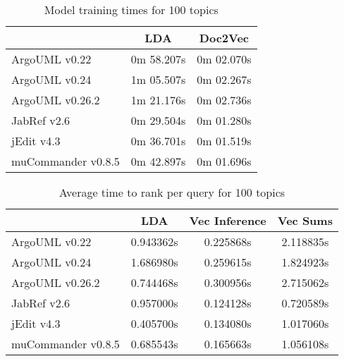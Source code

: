 \begin{table}
\centering
\begin{tabular}{lcc}
\toprule
                {} & LDA    & Doc2Vec \\
\midrule
ArgoUML v0.22      &  0m 58.207s     &  0m 02.070s     \\
ArgoUML v0.24      &  1m 05.507s     &  0m 02.267s     \\
ArgoUML v0.26.2    &  1m 21.176s     &  0m 02.736s     \\
JabRef v2.6        &  0m 29.504s     &  0m 01.280s     \\
jEdit v4.3         &  0m 36.701s     &  0m 01.519s     \\
muCommander v0.8.5 &  0m 42.897s     &  0m 01.696s     \\
\bottomrule
\end{tabular}
\caption{Model training times for 100 topics}
\end{table}


\begin{table}
\centering
\begin{tabular}{lccc}
\toprule
                {} & LDA    & Vec Inference & Vec Sums \\
\midrule
ArgoUML v0.22      & 0.943362s      &  0.225868s     &  2.118835s         \\
ArgoUML v0.24      & 1.686980s      &  0.259615s     &  1.824923s         \\
ArgoUML v0.26.2    & 0.744468s      &  0.300956s     &  2.715062s         \\
JabRef v2.6        & 0.957000s      &  0.124128s     &  0.720589s         \\
jEdit v4.3         & 0.405700s      &  0.134080s     &  1.017060s         \\
muCommander v0.8.5 & 0.685543s      &  0.165663s     &  1.056108s         \\
\bottomrule
\end{tabular}
\caption{Average time to rank per query for 100 topics}
\end{table}
